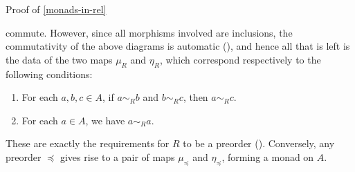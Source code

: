 \begin{Proof}{Proof of \cref{monads-in-rel}}
\begin{webcompile}
%
    \end{webcompile}%
    commute. However, since all morphisms involved are inclusions, the commutativity of the above diagrams is automatic (), and hence all that is left is the data of the two maps $\mu_{R}$ and $\eta_{R}$, which correspond respectively to the following conditions:
    \begin{enumerate}
        \item\label{proof-of-monads-in-rel-1}For each $a,b,c\in A$, if $a\sim_{R}b$ and $b\sim_{R}c$, then $a\sim_{R}c$.
        \item\label{proof-of-monads-in-rel-2}For each $a\in A$, we have $a\sim_{R}a$.
    \end{enumerate}
    These are exactly the requirements for $R$ to be a preorder (). Conversely, any preorder $\preceq$ gives rise to a pair of maps $\mu_{\preceq}$ and $\eta_{\preceq}$, forming a monad on $A$.
\end{Proof}
